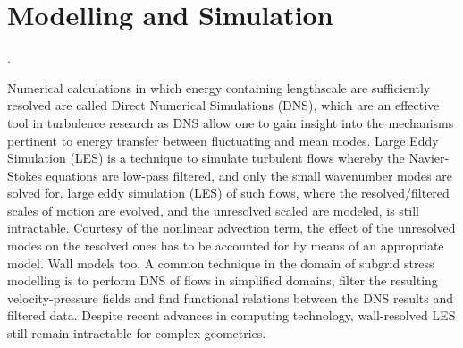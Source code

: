 \section{Modelling and Simulation}
.




Numerical calculations in which energy containing lengthscale are sufficiently resolved are called Direct Numerical Simulations (DNS), which are an effective tool in turbulence research \cite{moin_DNS_research} as DNS allow one to gain insight into the mechanisms pertinent to energy transfer between fluctuating and mean modes. Large Eddy Simulation (LES) is a technique to simulate turbulent flows whereby the Navier-Stokes equations are low-pass filtered, and only the small wavenumber modes are solved for. large eddy simulation (LES) of such flows, where the resolved/filtered scales of motion are evolved, and the unresolved scaled are modeled, is still intractable. Courtesy of the nonlinear advection term, the effect of the unresolved modes on the resolved ones has to be accounted for by means of an appropriate model. Wall models too. A common technique in the domain of subgrid stress modelling is to perform DNS of flows in simplified domains, filter the resulting velocity-pressure fields and find functional relations between the DNS results and filtered data. Despite recent advances in computing technology, wall-resolved LES still remain intractable for complex geometries.


    

